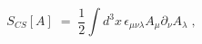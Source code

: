\begin{equation}
S_{CS}[A]\;=\;\frac{1}{2}\int d^{3}x\,\epsilon _{\mu \nu \lambda }A_{\mu
}\partial _{\nu }A_{\lambda }\;,  \label{c-s}
\end{equation}

